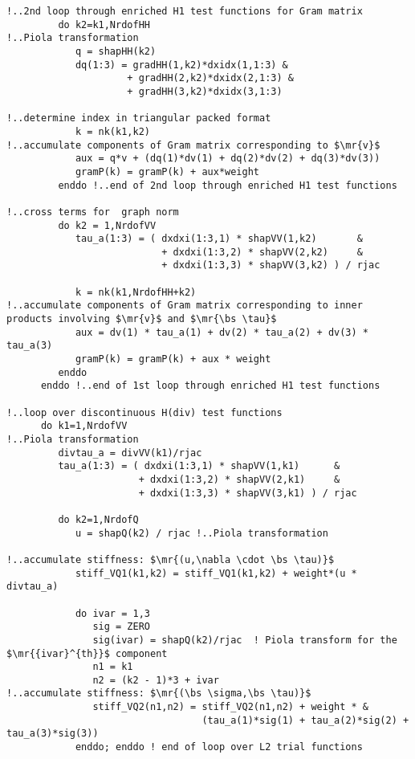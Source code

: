 \begin{lstlisting}[mathescape,caption=\file{POISSON/ULTRAWEAK\_DPG/}\routine{elem}: element integration]
!..2nd loop through enriched H1 test functions for Gram matrix
         do k2=k1,NrdofHH
!..Piola transformation
            q = shapHH(k2)
            dq(1:3) = gradHH(1,k2)*dxidx(1,1:3) &
                     + gradHH(2,k2)*dxidx(2,1:3) &
                     + gradHH(3,k2)*dxidx(3,1:3)

!..determine index in triangular packed format            
            k = nk(k1,k2)
!..accumulate components of Gram matrix corresponding to $\mr{v}$
            aux = q*v + (dq(1)*dv(1) + dq(2)*dv(2) + dq(3)*dv(3))
            gramP(k) = gramP(k) + aux*weight
         enddo !..end of 2nd loop through enriched H1 test functions

!..cross terms for  graph norm
         do k2 = 1,NrdofVV
            tau_a(1:3) = ( dxdxi(1:3,1) * shapVV(1,k2)       &
                           + dxdxi(1:3,2) * shapVV(2,k2)     &
                           + dxdxi(1:3,3) * shapVV(3,k2) ) / rjac

            k = nk(k1,NrdofHH+k2)
!..accumulate components of Gram matrix corresponding to inner products involving $\mr{v}$ and $\mr{\bs \tau}$
            aux = dv(1) * tau_a(1) + dv(2) * tau_a(2) + dv(3) * tau_a(3)
            gramP(k) = gramP(k) + aux * weight
         enddo
      enddo !..end of 1st loop through enriched H1 test functions

!..loop over discontinuous H(div) test functions
      do k1=1,NrdofVV
!..Piola transformation
         divtau_a = divVV(k1)/rjac
         tau_a(1:3) = ( dxdxi(1:3,1) * shapVV(1,k1)      &
                       + dxdxi(1:3,2) * shapVV(2,k1)     &
                       + dxdxi(1:3,3) * shapVV(3,k1) ) / rjac
         
         do k2=1,NrdofQ
            u = shapQ(k2) / rjac !..Piola transformation

!..accumulate stiffness: $\mr{(u,\nabla \cdot \bs \tau)}$
            stiff_VQ1(k1,k2) = stiff_VQ1(k1,k2) + weight*(u * divtau_a)

            do ivar = 1,3
               sig = ZERO
               sig(ivar) = shapQ(k2)/rjac  ! Piola transform for the $\mr{{ivar}^{th}}$ component
               n1 = k1
               n2 = (k2 - 1)*3 + ivar
!..accumulate stiffness: $\mr{(\bs \sigma,\bs \tau)}$
               stiff_VQ2(n1,n2) = stiff_VQ2(n1,n2) + weight * & 
                                  (tau_a(1)*sig(1) + tau_a(2)*sig(2) + tau_a(3)*sig(3))
            enddo; enddo ! end of loop over L2 trial functions


\end{lstlisting}
